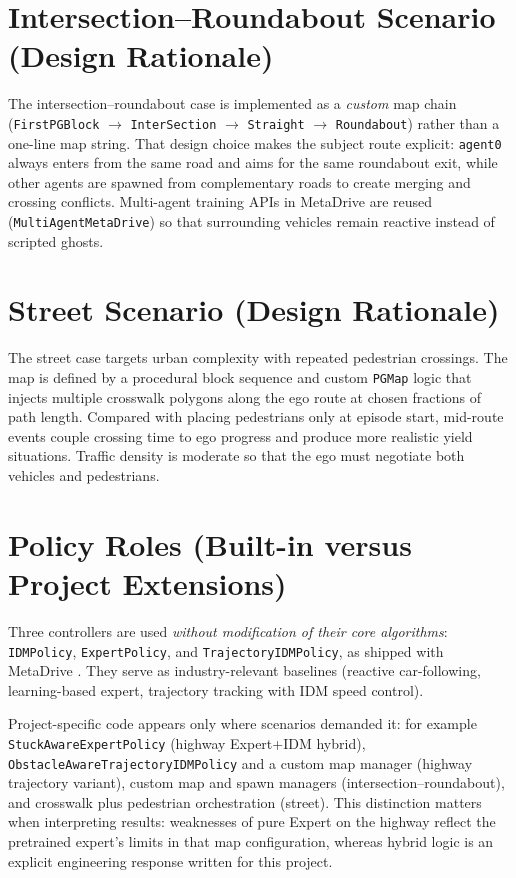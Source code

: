 \documentclass[12pt,a4paper]{report}
\begin{document}
\section{Intersection--Roundabout Scenario (Design Rationale)}
The intersection--roundabout case is implemented as a \emph{custom} map chain (\texttt{FirstPGBlock} $\rightarrow$ \texttt{InterSection} $\rightarrow$ \texttt{Straight} $\rightarrow$ \texttt{Roundabout}) rather than a one-line map string. That design choice makes the subject route explicit: \texttt{agent0} always enters from the same road and aims for the same roundabout exit, while other agents are spawned from complementary roads to create merging and crossing conflicts. Multi-agent training APIs in MetaDrive are reused (\texttt{MultiAgentMetaDrive}) so that surrounding vehicles remain reactive instead of scripted ghosts.

\section{Street Scenario (Design Rationale)}
The street case targets urban complexity with repeated pedestrian crossings. The map is defined by a procedural block sequence and custom \texttt{PGMap} logic that injects multiple crosswalk polygons along the ego route at chosen fractions of path length. Compared with placing pedestrians only at episode start, mid-route events couple crossing time to ego progress and produce more realistic yield situations. Traffic density is moderate so that the ego must negotiate both vehicles and pedestrians.

\section{Policy Roles (Built-in versus Project Extensions)}
Three controllers are used \emph{without modification of their core algorithms}: \texttt{IDMPolicy}, \texttt{ExpertPolicy}, and \texttt{TrajectoryIDMPolicy}, as shipped with MetaDrive \cite{metadrive,metadrive_docs}. They serve as industry-relevant baselines (reactive car-following, learning-based expert, trajectory tracking with IDM speed control).

Project-specific code appears only where scenarios demanded it: for example \texttt{StuckAwareExpertPolicy} (highway Expert+IDM hybrid), \texttt{ObstacleAwareTrajectoryIDMPolicy} and a custom map manager (highway trajectory variant), custom map and spawn managers (intersection--roundabout), and crosswalk plus pedestrian orchestration (street). This distinction matters when interpreting results: weaknesses of pure Expert on the highway reflect the pretrained expert's limits in that map configuration, whereas hybrid logic is an explicit engineering response written for this project.
\end{document}
